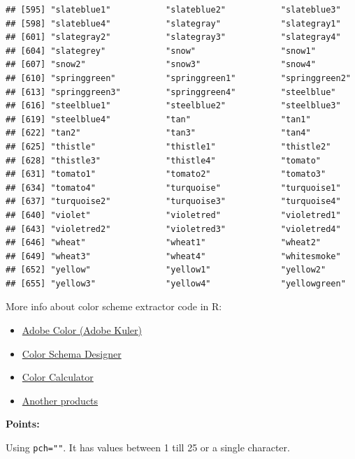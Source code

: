 \documentclass[]{book}
\begin{document}
\begin{verbatim}
## [595] "slateblue1"           "slateblue2"           "slateblue3"          
## [598] "slateblue4"           "slategray"            "slategray1"          
## [601] "slategray2"           "slategray3"           "slategray4"          
## [604] "slategrey"            "snow"                 "snow1"               
## [607] "snow2"                "snow3"                "snow4"               
## [610] "springgreen"          "springgreen1"         "springgreen2"        
## [613] "springgreen3"         "springgreen4"         "steelblue"           
## [616] "steelblue1"           "steelblue2"           "steelblue3"          
## [619] "steelblue4"           "tan"                  "tan1"                
## [622] "tan2"                 "tan3"                 "tan4"                
## [625] "thistle"              "thistle1"             "thistle2"            
## [628] "thistle3"             "thistle4"             "tomato"              
## [631] "tomato1"              "tomato2"              "tomato3"             
## [634] "tomato4"              "turquoise"            "turquoise1"          
## [637] "turquoise2"           "turquoise3"           "turquoise4"          
## [640] "violet"               "violetred"            "violetred1"          
## [643] "violetred2"           "violetred3"           "violetred4"          
## [646] "wheat"                "wheat1"               "wheat2"              
## [649] "wheat3"               "wheat4"               "whitesmoke"          
## [652] "yellow"               "yellow1"              "yellow2"             
## [655] "yellow3"              "yellow4"              "yellowgreen"
\end{verbatim}

More info about color scheme extractor code in R:

\begin{itemize}
\item
  \href{https://color.adobe.com/de/create/color-wheel/}{Adobe Color
  (Adobe Kuler)}
\item
  \href{http://colorschemedesigner.com/csd-3.5/}{Color Schema Designer}
\item
  \href{https://www.sessions.edu/color-calculator/}{Color Calculator}
\item
  \href{https://www.producthunt.com/alternatives/adobe-kuler}{Another
  products}
\end{itemize}

\textbf{Points: }

Using \texttt{pch=""}. It has values between 1 till 25 or a single
character.
\end{document}
